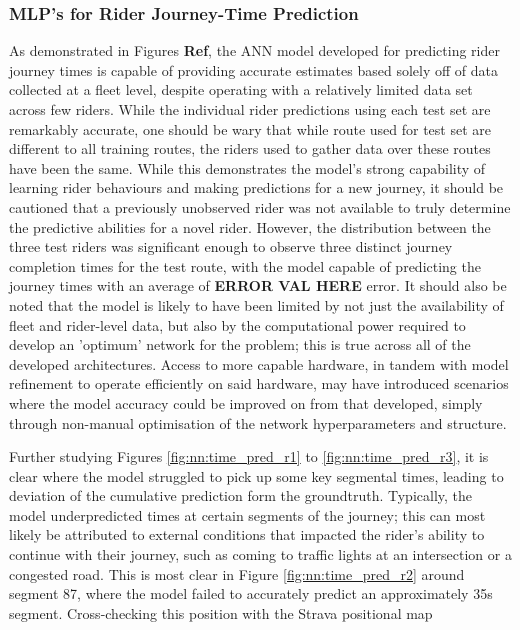 \documentclass[a4paper, 10pt]{article}
\numberwithin{equation}{section}
\begin{document}
\subsubsection{MLP's for Rider Journey-Time Prediction}
As demonstrated in Figures \textbf{Ref}, the ANN model developed for predicting rider journey times is capable of providing accurate estimates based solely off of data collected at a fleet level, despite operating with a relatively limited data set across few riders. While the individual rider predictions using each test set are remarkably accurate, one should be wary that while route used for test set are different to all training routes, the riders used to gather data over these routes have been the same. While this demonstrates the model's strong capability of learning rider behaviours and making predictions for a new journey, it should be cautioned that a previously unobserved rider was not available to truly determine the predictive abilities for a novel rider. However, the distribution between the three test riders was significant enough to observe three distinct journey completion times for the test route, with the model capable of predicting the journey times with an average of \textbf{ERROR VAL HERE} error. It should also be noted that the model is likely to have been limited by not just the availability of fleet and rider-level data, but also by the computational power required to develop an 'optimum' network for the problem; this is true across all of the developed architectures. Access to more capable hardware, in tandem with model refinement to operate efficiently on said hardware, may have introduced scenarios where the model accuracy could be improved on from that developed, simply through non-manual optimisation of the network hyperparameters and structure.

Further studying Figures \ref{fig:nn:time_pred_r1} to \ref{fig:nn:time_pred_r3}, it is clear where the model struggled to pick up some key segmental times, leading to deviation of the cumulative prediction form the groundtruth. Typically, the model underpredicted times at certain segments of the journey; this can most likely be attributed to external conditions that impacted the rider's ability to continue with their journey, such as coming to traffic lights at an intersection or a congested road. This is most clear in Figure \ref{fig:nn:time_pred_r2} around segment 87, where the model failed to accurately predict an approximately 35s segment. Cross-checking this position with the Strava positional map 
\end{document}
